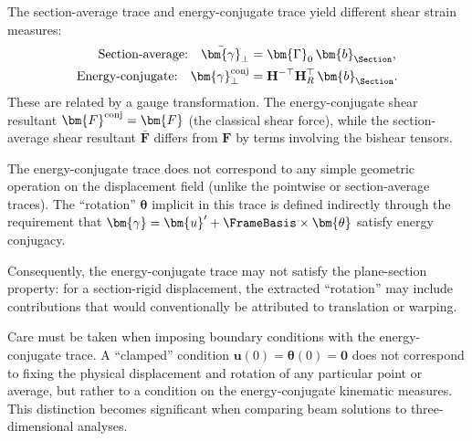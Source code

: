 \begin{remark}
The section-average trace and energy-conjugate trace yield different shear 
strain measures:
\begin{align*}
\text{Section-average:} \quad \bar{\bm{\gamma}}_\perp &= \bm{\Gamma}_0\,\bm{b}_{\Section}, \\
\text{Energy-conjugate:} \quad \bm{\gamma}_\perp^{\rm conj} &= \mathbf{H}^{-\top}\mathbf{H}_R^\top\,\bm{b}_{\Section}.
\end{align*}
These are related by a gauge transformation. The energy-conjugate shear 
resultant $\bm{F}^{\rm conj} = \bm{F}$ (the classical shear force), while the 
section-average shear resultant $\bar{\bm{F}}$ differs from $\bm{F}$ by terms 
involving the bishear tensors.
\end{remark}

\begin{remark}
The energy-conjugate trace does not correspond to any simple geometric 
operation on the displacement field (unlike the pointwise or section-average 
traces). The ``rotation'' $\bm{\theta}$ implicit in this trace is defined 
indirectly through the requirement that $\bm{\gamma} = \bm{u}' + \FrameBasis \times \bm{\theta}$ 
satisfy energy conjugacy.

Consequently, the energy-conjugate trace may not satisfy the plane-section 
property: for a section-rigid displacement, the extracted ``rotation'' may 
include contributions that would conventionally be attributed to translation 
or warping.
\end{remark}

\begin{remark}
Care must be taken when imposing boundary conditions with the energy-conjugate 
trace. 
A ``clamped'' condition $\bm{u}(0) = \bm{\theta}(0) = \mathbf{0}$ does not 
correspond to fixing the physical displacement and rotation of any particular 
point or average, but rather to a condition on the energy-conjugate kinematic 
measures. 
This distinction becomes significant when comparing beam solutions 
to three-dimensional analyses.
\end{remark}

